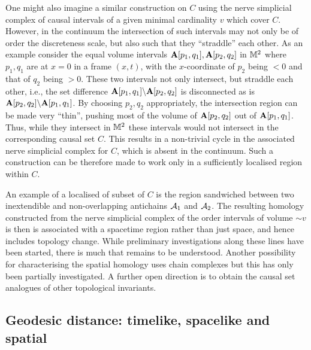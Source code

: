 One might also imagine a similar construction on $C$ using  the nerve simplicial complex  of 
  causal intervals of a given minimal cardinality  $v$ which cover $C$. However, in the continuum the intersection of such intervals may not
  only  be of order the discreteness scale, but also such that they ``straddle'' each other. As an example consider the
  equal volume intervals  $\mathbf A[p_1,q_1], \mathbf A[p_2,q_2]$ in $\mathbb M^2$  where $p_1,q_1$ are at $x=0$ in a  frame
  $(x,t)$, with the $x$-coordinate of
$p_2$ being  $<0$ and that of $q_2$ being $>0$.  These two intervals not only intersect, but  straddle each other, i.e.,
the set difference 
$\mathbf A[p_1,q_1] \backslash \mathbf A[p_2,q_2]$ is disconnected as is  $\mathbf A[p_2,q_2]\backslash \mathbf A[p_1,q_1]$. By choosing $p_2,q_2$
appropriately, the intersection  region can be made very ``thin'', pushing most of the volume of $\mathbf A[p_2,q_2]$ out of
$\mathbf A[p_1,q_1]$. Thus, while they intersect in $\mathbb M^2$ these intervals  would not intersect in the corresponding causal set
$C$. This results in a non-trivial cycle in the associated nerve simplicial complex for $C$, which is absent  in the
continuum. Such a  construction can be therefore made to work only in a sufficiently localised region within $C$.

An example of  a localised of subset of $C$ is the region   sandwiched between two inextendible and
non-overlapping antichains $\mathcal A_1$ and $\mathcal A_2$. The resulting homology constructed from the nerve
simplicial complex {of the order intervals of volume $\sim v$} is then is associated with 
a spacetime region rather than just space, and hence includes topology change. While preliminary investigations
  along these lines have been started, there is much that remains to be understood.  Another possibility for
characterising the spatial homology uses  chain complexes but this has only been partially
investigated.  A further open direction is to obtain  the causal set analogues of {other} topological invariants. 


\subsection{Geodesic distance: timelike, spacelike and spatial} 
\label{ssec:distance}

